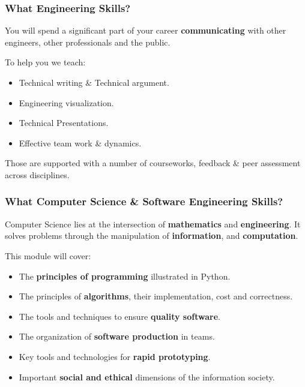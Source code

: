\documentclass{beamer} %
\newcommand\emc[1]{\textcolor{brightblue}{\textbf{#1}}}
\begin{document}
\begin{frame}
\frametitle{What Engineering Skills?} 

You will spend a significant part of your career \emc{communicating} with other engineers, other professionals and the public.

\vspace{3mm}
To help you we teach:
\begin{itemize}
\item Technical writing \& Technical argument.
\item Engineering visualization.
\item Technical Presentations.
\item Effective team work \& dynamics.
\end{itemize}

\vspace{3mm}
Those are supported with a number of courseworks, feedback \& peer assessment across disciplines.

\end{frame}


\begin{frame}
\frametitle{What Computer Science \& Software Engineering Skills?} 

Computer Science lies at the intersection of \emc{mathematics} and \emc{engineering}. It solves problems through the manipulation of \emc{information}, and \emc{computation}.

\vspace{3mm}
This module will cover:
\begin{itemize}
	\item The \emc{principles of programming} illustrated in Python.
	\item The principles of \emc{algorithms}, their implementation, cost and correctness.
	\item The tools and techniques to ensure \emc{quality software}.
	\item The organization of \emc{software production} in teams.
	\item Key tools and technologies for \emc{rapid prototyping}.
	\item Important \emc{social and ethical} dimensions of the information society.
\end{itemize}

\end{frame}
\end{document}
